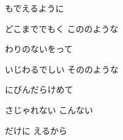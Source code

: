 \documentclass[14pt]{extreport}
\begin{document}
{  もでえるように
  \jisho{}

\item
  どこまででもく こののような
  \jisho{}

  わりのないをって
  \jisho{}

\item
  いじわるでしい そののような
  \jisho{}

  にびんだらけめて
  \jisho{}

\item
  さじゃれない こんない
  \jisho{}

  だけに  えるから
  \jisho{}


}
\end{document}
